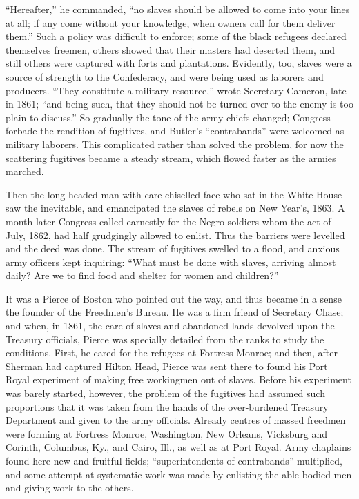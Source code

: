 “Hereafter,” he commanded, “no slaves should be allowed to come into your lines at all; if any come without your knowledge, when owners call for them deliver them.” Such a policy was difficult to enforce; some of the black refugees declared themselves freemen, others showed that their masters had deserted them, and still others were captured with forts and plantations. Evidently, too, slaves were a source of strength to the Confederacy, and were being used as laborers and producers. “They constitute a military resource,” wrote Secretary Cameron, late in 1861; “and being such, that they should not be turned over to the enemy is too plain to discuss.” So gradually the tone of the army chiefs changed; Congress forbade the rendition of fugitives, and Butler’s “contrabands” were welcomed as military laborers. This complicated rather than solved the problem, for now the scattering fugitives became a steady stream, which flowed faster as the armies marched.\par

Then the long-headed man with care-chiselled face who sat in the White House saw the inevitable, and emancipated the slaves of rebels on New Year’s, 1863. A month later Congress called earnestly for the Negro soldiers whom the act of July, 1862, had half grudgingly allowed to enlist. Thus the barriers were levelled and the deed was done. The stream of fugitives swelled to a flood, and anxious army officers kept inquiring: “What must be done with slaves, arriving almost daily? Are we to find food and shelter for women and children?”\par

It was a Pierce of Boston who pointed out the way, and thus became in a sense the founder of the Freedmen’s Bureau. He was a firm friend of Secretary Chase; and when, in 1861, the care of slaves and abandoned lands devolved upon the Treasury officials, Pierce was specially detailed from the ranks to study the conditions. First, he cared for the refugees at Fortress Monroe; and then, after Sherman had captured Hilton Head, Pierce was sent there to found his Port Royal experiment of making free workingmen out of slaves. Before his experiment was barely started, however, the problem of the fugitives had assumed such proportions that it was taken from the hands of the over-burdened Treasury Department and given to the army officials. Already centres of massed freedmen were forming at Fortress Monroe, Washington, New Orleans, Vicksburg and Corinth, Columbus, Ky., and Cairo, Ill., as well as at Port Royal. Army chaplains found here new and fruitful fields; “superintendents of contrabands” multiplied, and some attempt at systematic work was made by enlisting the able-bodied men and giving work to the others.\par

